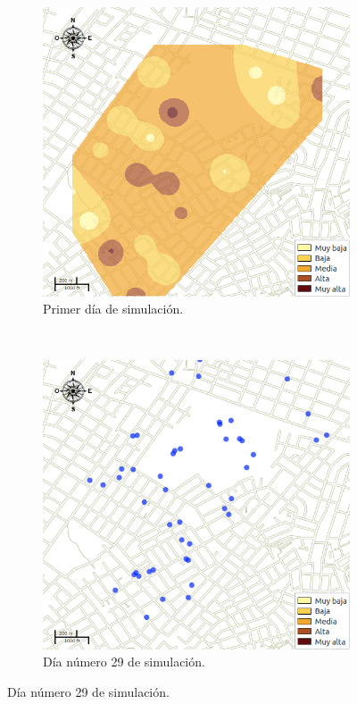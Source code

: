 \begin{figure}[!htbp]
    \centering
    \begin{subfigure}[b]{0.45\textwidth}
            \includegraphics[width=\textwidth]{capitulo-6/graphics/raster/temp-20-0.png}
            \caption{\label{fig:niveles-infestacion-20-a}Primer día de simulación.}
    \end{subfigure}
    ~~
    \begin{subfigure}[b]{0.45\textwidth}
            \includegraphics[width=\textwidth]{capitulo-6/graphics/raster/temp-20-28.png}
            \caption{\label{fig:niveles-infestacion-20-b}Día número 29 de simulación.}
    \end{subfigure}


\end{figure}
